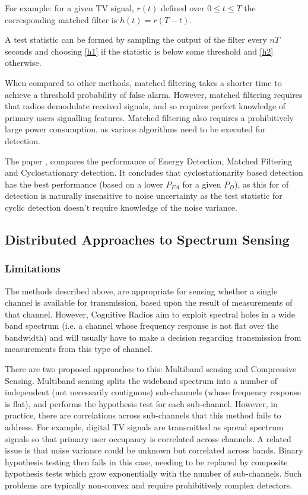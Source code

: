 For example: for a given TV signal, \(r\left(t\right)\) defined over \(0 \leq t \leq T\) the corresponding matched filter is \(h\left(t\right) = r\left(T - t\right)\). 

A test statistic can be formed by sampling the output of the filter every \(nT\) seconds and choosing \ref{h1} if the statistic is below some threshold and \ref{h2} otherwise.

When compared to other methods, matched filtering takes a shorter time to achieve a threshold probability of false alarm. However, matched filtering requires that radios demodulate received signals, and so requires perfect knowledge of primary users signalling features. Matched filtering also requires a prohibitively large power consumption, as various algorithms need to be executed for detection.

The paper \cite{bhargavi2010performance}, compares the performance of Energy Detection, Matched Filtering and Cyclostationary detection. It concludes that cyclostationarity based detection has the best performance (based on a lower \(P_{FA}\) for a given \(P_D\)), as this for of detection is naturally insensitive to noise uncertainty as the test statistic for cyclic detection doesn't require knowledge of the noise variance.

\subsection{Distributed Approaches to Spectrum Sensing}

\subsubsection{Limitations}
The methods described above, are appropriate for sensing whether a single channel is available for transmission, based upon the result of measurements of that channel. However, Cognitive Radios aim to exploit spectral holes in a wide band spectrum (i.e. a channel whose frequency response is not flat over the bandwidth) and will usually have to make a decision regarding transmission from measurements from this type of channel.

There are two proposed approaches to this: Multiband sensing and Compressive Sensing. Multiband sensing splits the wideband spectrum into a number of independent (not necessarily contiguous) sub-channels (whose frequency response is flat), and performs the hypothesis test for each sub-channel. However, in practice, there are correlations across sub-channels that this method fails to address. For example, digital TV signals are transmitted as spread spectrum signals so that primary user occupancy is correlated across channels. A related issue is that noise variance could be unknown but correlated across bands. Binary hypothesis testing then fails in this case, needing to be replaced by composite hypothesis tests which grow exponentially with the number of sub-channels. Such problems are typically non-convex and require prohibitively complex detectors.

